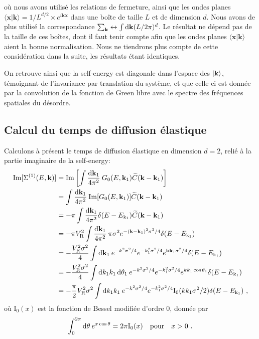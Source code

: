 où nous avons utilisé les relations de fermeture, ainsi que les ondes planes $\langle\mathbf{x}|\mathbf{k}\rangle=1/L^{d/2} \times e^{i\mathbf{k}\mathbf{x}}$ dans une boîte de taille $L$ et de dimension $d$. Nous avons de plus utilisé la correspondance $\sum_{\mathbf{k}} \leftrightarrow \int{\mathop{}\mathopen{}\mathrm{d}\mathbf{k} (L/2\pi)^d}$. Le résultat ne dépend pas de la taille de ces boîtes, dont il faut tenir compte afin que les ondes planes $\langle\mathbf{x}|\mathbf{k}\rangle$ aient la bonne normalisation. Nous ne tiendrons plus compte de cette considération dans la suite, les résultats étant identiques.

On retrouve ainsi que la self-energy est diagonale dans l'espace des $\left| \mathbf{k} \right\rangle$, témoignant de l'invariance par translation du système, et que celle-ci est donnée par la convolution de la fonction de Green libre avec le spectre des fréquences spatiales du désordre.


\subsection{Calcul du temps de diffusion élastique}
Calculons à présent le temps de diffusion élastique en dimension $d=2$, relié à la partie imaginaire de la self-energy:
\begin{align}
\mathrm{Im}[\Sigma^{(1)}(E,\mathbf{k})]&= \mathrm{Im} \left[ \int{\frac{\mathop{}\mathopen{}\mathrm{d}\mathbf{k}_{\mathrm{1}}}{4\pi^2}\: G_0(E,\mathbf{k}_{\mathrm{1}}) \widetilde{C}(\mathbf{k}-\mathbf{k}_{\mathrm{1}})}\right] \\ 
&= \int{\frac{\mathop{}\mathopen{}\mathrm{d}\mathbf{k}_{\mathrm{1}}}{4\pi^2}\: \mathrm{Im}[G_0(E,\mathbf{k}_{\mathrm{1}})] \widetilde{C}(\mathbf{k}-\mathbf{k}_{\mathrm{1}})} \\
&= -\pi \int{\frac{\mathop{}\mathopen{}\mathrm{d}\mathbf{k}_{\mathrm{1}}}{4\pi^2} \delta(E-E_{\mathrm{k}_1}) \widetilde{C}(\mathbf{k}-\mathbf{k}_{\mathrm{1}})} \\
&= - \pi V_{\mathrm{R}}^2 \int{\frac{\mathop{}\mathopen{}\mathrm{d}\mathbf{k}_{\mathrm{1}}}{4\pi^2} \: \pi \sigma^2 e^{-(\mathbf{k}-\mathbf{k}_{\mathrm{1}})^2 \sigma^2/4} \delta(E-E_{\mathrm{k}_1})} \\
&=-\frac{V_{\mathrm{R}}^2\sigma^2}{4} \int{\mathop{}\mathopen{}\mathrm{d}\mathbf{k}_{\mathrm{1}} \: e^{-k^2\sigma^2/4} e^{-k_{\mathrm{1}}^2\sigma^2/4} e^{\mathbf{k}\mathbf{k}_{\mathrm{1}}\sigma^2/4} \delta(E-E_{\mathrm{k}_1})}\\
&= -\frac{V_{\mathrm{R}}^2\sigma^2}{4} \int{\mathop{}\mathopen{}\mathrm{d}k_{\mathrm{1}} k_{\mathrm{1}} \mathop{}\mathopen{}\mathrm{d}\theta_{\mathrm{1}} \: e^{-k^2\sigma^2/4} e^{-k_{\mathrm{1}}^2\sigma^2/4} e^{k k_{\mathrm{1}} \cos{\theta_{\mathrm{1}}}} \delta(E-E_{\mathrm{k}_1})} \\
&= -\frac{\pi}{2} V_{\mathrm{R}}^2\sigma^2 \int{\mathop{}\mathopen{}\mathrm{d}k_{\mathrm{1}} k_{\mathrm{1}} \: e^{-k^2\sigma^2/4} e^{-k_{\mathrm{1}}^2\sigma^2/4} \mathrm{I_0}(k k_{\mathrm{1}}\sigma^2/2) \delta(E-E_{\mathrm{k}_1})} \text{ ,}
\end{align}
où $\mathrm{I_0}(x)$ est la fonction de Bessel modifiée d'ordre 0, donnée par
\begin{equation}
\int_{0}^{2\pi}{\mathop{}\mathopen{}\mathrm{d}\theta\:e^{x\cos\theta}}=2\pi \mathrm{I_0}(x) \quad \text{pour} \quad x>0 \text{ .}
\end{equation}

